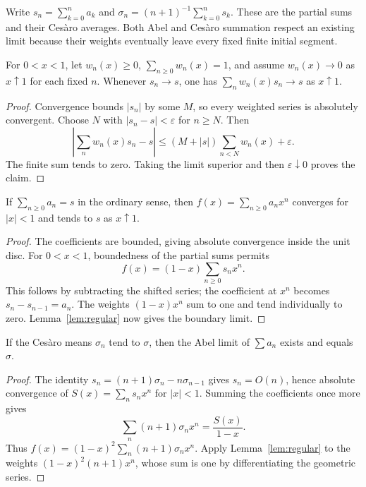 Write $s_n=\sum_{k=0}^na_k$ and $\sigma_n=(n+1)^{-1}\sum_{k=0}^ns_k$. These are the partial sums and their Ces\`aro averages. Both Abel and Ces\`aro summation respect an existing limit because their weights eventually leave every fixed finite initial segment.

\begin{lemma}\label{lem:regular}
For $0<x<1$, let $w_n(x)\ge0$, $\sum_{n\ge0}w_n(x)=1$, and assume $w_n(x)\to0$ as $x\uparrow1$ for each fixed $n$. Whenever $s_n\to s$, one has $\sum_nw_n(x)s_n\to s$ as $x\uparrow1$.
\end{lemma}
\begin{proof}
Convergence bounds $|s_n|$ by some $M$, so every weighted series is absolutely convergent. Choose $N$ with $|s_n-s|<\varepsilon$ for $n\ge N$. Then
\[\left|\sum_nw_n(x)s_n-s\right|
 \le(M+|s|)\sum_{n<N}w_n(x)+\varepsilon.
\]
The finite sum tends to zero. Taking the limit superior and then $\varepsilon\downarrow0$ proves the claim.
\end{proof}

\begin{theorem}[Abel, 1826]\label{thm:abel}
If $\sum_{n\ge0}a_n=s$ in the ordinary sense, then $f(x)=\sum_{n\ge0}a_nx^n$ converges for $|x|<1$ and tends to $s$ as $x\uparrow1$.
\end{theorem}
\begin{proof}
The coefficients are bounded, giving absolute convergence inside the unit disc. For $0<x<1$, boundedness of the partial sums permits
\[f(x)=(1-x)\sum_{n\ge0}s_nx^n.
\]
This follows by subtracting the shifted series; the coefficient at $x^n$ becomes $s_n-s_{n-1}=a_n$. The weights $(1-x)x^n$ sum to one and tend individually to zero. Lemma~\ref{lem:regular} now gives the boundary limit.
\end{proof}

\begin{corollary}\label{cor:cesaroabel}
If the Ces\`aro means $\sigma_n$ tend to $\sigma$, then the Abel limit of $\sum a_n$ exists and equals $\sigma$.
\end{corollary}
\begin{proof}
The identity $s_n=(n+1)\sigma_n-n\sigma_{n-1}$ gives $s_n=O(n)$, hence absolute convergence of $S(x)=\sum_ns_nx^n$ for $|x|<1$. Summing the coefficients once more gives
\[\sum_n(n+1)\sigma_nx^n=\frac{S(x)}{1-x}.
\]
Thus $f(x)=(1-x)^2\sum_n(n+1)\sigma_nx^n$. Apply Lemma~\ref{lem:regular} to the weights $(1-x)^2(n+1)x^n$, whose sum is one by differentiating the geometric series.
\end{proof}

